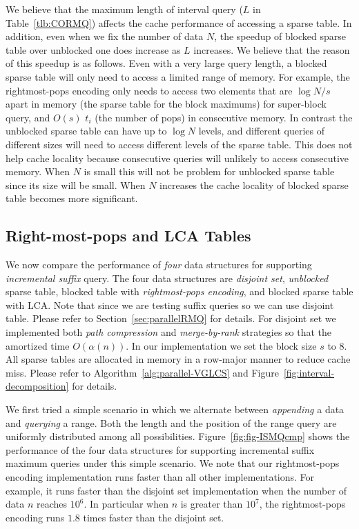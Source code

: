We believe that the maximum length of interval query ($L$ in
Table~\ref{tlb:CORMQ}) affects the cache performance of accessing a
sparse table.  In addition, even when we fix the number of data $N$,
the speedup of blocked sparse table over unblocked one does increase
as $L$ increases.  We believe that the reason of this speedup is as
follows.  Even with a very large query length, a blocked sparse table
will only need to access a limited range of memory.  For example, the
rightmost-pops encoding only needs to access two elements that are
$\log {N/s}$ apart in memory (the sparse table for the block maximums)
for super-block query, and $O(s)$ $t_i$ (the number of pops) in
consecutive memory.  In contrast the unblocked sparse table can have
up to $\log N$ levels, and different queries of different sizes will
need to access different levels of the sparse table.  This does not
help cache locality because consecutive queries will unlikely to
access consecutive memory.  When $N$ is small this will not be problem
for unblocked sparse table since its size will be small.  When $N$
increases the cache locality of blocked sparse table becomes more
significant.



\subsection{Right-most-pops and LCA Tables}

We now compare the performance of {\em four} data structures for
supporting {\em incremental suffix} query.  The four data structures
are {\em disjoint set}, {\em unblocked} sparse table, blocked table
with {\em rightmost-pops encoding}, and blocked sparse table with LCA.
Note that since we are testing suffix queries so we can use disjoint
table.  Please refer to Section~\ref{sec:parallelRMQ} for details.
For disjoint set we implemented both {\em path compression} and {\em
  merge-by-rank} strategies so that the amortized time $O(\alpha(n))$.
In our implementation we set the block size $s$ to $8$.  All sparse
tables are allocated in memory in a row-major manner to reduce cache
miss.  Please refer to Algorithm~\ref{alg:parallel-VGLCS} and
Figure~\ref{fig:interval-decomposition} for details.


We first tried a simple scenario in which we alternate between {\em
  appending} a data and {\em querying} a range.  Both the length and
the position of the range query are uniformly distributed among all
possibilities.  Figure~\ref{fig:fig-ISMQcmp} shows the performance of
the four data structures for supporting incremental suffix maximum
queries under this simple scenario.  We note that our rightmost-pops
encoding implementation runs faster than all other implementations.
For example, it runs faster than the disjoint set implementation when
the number of data $n$ reaches $10^6$.  In particular when $n$ is
greater than $10^7$, the rightmost-pops encoding runs $1.8$ times
faster than the disjoint set.


